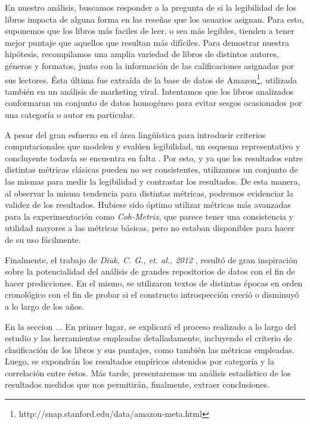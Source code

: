 \documentclass[12pt,journal,compsoc]{IEEEtran}
\begin{document}
En nuestro análisis, buscamos responder a la pregunta de si la legibilidad de los libros impacta de alguna forma en las reseñas que los usuarios asignan. Para esto, suponemos que los libros más faciles de leer, o sea más legibles, tienden a tener mejor puntaje que aquellos que resultan más difíciles. Para demostrar nuestra hipótesis, recompilamos una amplia variedad de libros de distintos autores, géneros y formatos, junto con la información de las calificaciones asignadas por sus lectores. Ésta última fue extraída de la base de datos de Amazon\footnote{http://snap.stanford.edu/data/amazon-meta.html}, utilizada también en un análisis de marketing viral\cite{leskovec}. Intentamos que los libros analizados conformaran un conjunto de datos homogéneo para evitar sesgos ocasionados por una categoría o autor en particular.

A pesar del gran esfuerzo en el área lingüística para introducir criterios computacionales que modelen y evalúen legibilidad, un esquema representativo y concluyente todavía se encuentra en falta \cite{orlow, klare, kanungo, karmakar}. Por esto, y ya que los resultados entre distintas métricas clásicas pueden no ser consistentes\cite{izgi}, utilizamos un conjunto de las mismas para medir la legibilidad y contrastar los resultados. De esta manera, al observar la misma tendencia para distintas métricas, podremos evidenciar la validez de los resultados. Hubiese sido óptimo utilizar métricas más avanzadas para la experimentación como \textit{Coh-Metrix}\cite{graesser}, que parece tener una consistencia y utilidad mayores a las métricas básicas\cite{crossley}, pero no estaban disponibles para hacer de su uso fácilmente.

Finalmente, el trabajo de \textit{Diuk, C. G., et. al., 2012} \cite{diuk}, resultó de gran inspiración sobre la potencialidad del análisis de grandes repositorios de datos con el fin de hacer predicciones. En el mismo, se utilizaron textos de distintas épocas en orden cronológico con el fin de probar si el constructo introspección creció o disminuyó a lo largo de los años.

En la seccion ... %
En primer lugar, se explicará el proceso realizado a lo largo del estudio y las herramientas empleadas detalladamente, incluyendo el criterio de clasificación de los libros y sus puntajes, como también las métricas empleadas. Luego, se expondrán los resultados empíricos obtenidos por categoría y la correlación entre éstos. Más tarde, presentaremos un análisis estadístico de los resultados medidos que nos permitirán, finalmente, extraer conclusiones.
\end{document}
